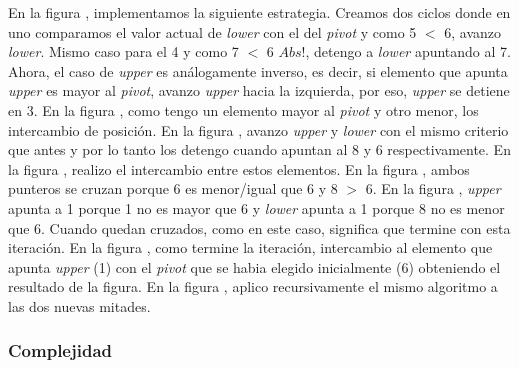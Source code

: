 \documentclass[10pt,a4paper]{article}
\begin{document}
\newline
\newline
En la figura , implementamos la siguiente estrategia. Creamos dos ciclos donde en uno comparamos el valor actual de \textit{lower} con el del \textit{pivot} y como 5 $<$ 6, avanzo \textit{lower}. Mismo caso para el 4 y como 7 $<$ 6 $Abs!$, detengo a \textit{lower} apuntando al 7. Ahora, el caso de \textit{upper} es análogamente inverso, es decir, si elemento que apunta \textit{upper} es mayor al \textit{pivot}, avanzo \textit{upper} hacia la izquierda, por eso, \textit{upper} se detiene en 3.   
\newline
\newline
En la figura , como tengo un elemento mayor al \textit{pivot} y otro menor, los intercambio de posición.
\newline
\newline
En la figura , avanzo \textit{upper} y \textit{lower} con el mismo criterio que antes y por lo tanto los detengo cuando apuntan al 8 y 6 respectivamente.
\newline
\newline
En la figura , realizo el intercambio entre estos elementos.
\newline
\newline
En la figura , ambos punteros se cruzan porque 6 es menor/igual que 6 y 8 $>$ 6.
\newline
\newline
En la figura , \textit{upper} apunta a 1 porque 1 no es mayor que 6 y \textit{lower} apunta a 1 porque 8 no es menor que 6. Cuando quedan cruzados, como en este caso,  significa que termine con esta iteración.
\newline
\newline
En la figura , como termine la iteración, intercambio al elemento que apunta \textit{upper} (1) con el \textit{pivot} que se habia elegido inicialmente (6) obteniendo el resultado de la figura.
\newline
\newline
En la figura , aplico recursivamente el mismo algoritmo a las dos nuevas mitades.
\newpage

\subsubsection{Complejidad}
\end{document}
